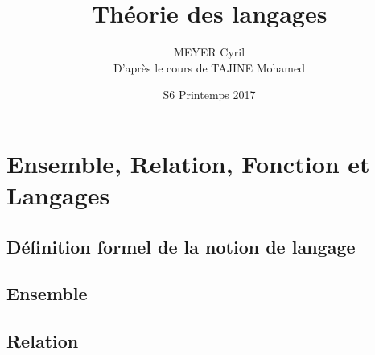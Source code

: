 \documentclass[12pt]{report}
\title{Théorie des langages}
\date{S6 Printemps 2017}
\author{MEYER Cyril\\D'après le cours de TAJINE Mohamed}
\begin{document}

\maketitle
\newpage
\tableofcontents
\newpage

\chapter{Ensemble, Relation, Fonction et Langages}

\section{Définition formel de la notion de langage}
	
\section{Ensemble}
	
\section{Relation}
	
\end{document}
